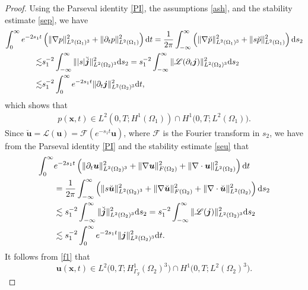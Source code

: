\documentclass[final,leqno]{siamltex}
\begin{document}
\begin{proof}
Using the Parseval identity \eqref{PI}, the assumptions \eqref{ash}, and the
stability estimate \eqref{sep}, we have
\begin{align*}
 \int_0^{\infty} e^{-2s_1 t}
 &\left(\|\nabla p\|^2_{L^2 (\Omega_1)^3}+\|\partial_t p
\|^2_{L^2(\Omega_1)}\right){\rm d}t
 =\frac{1}{2 \pi} \int_{-\infty}^{\infty}\left( \|\nabla \breve
p\|^2_{L^2(\Omega_1)^3}+ \|s \breve p\|^2_{L^2(\Omega_1)}\right) {\rm d} s_2\\
 \lesssim&  s_1 ^{-2} \int_{-\infty}^{\infty}  \| |s|\breve {\boldsymbol
j}\|^2_{L^2 (\Omega_2)^3}  {\rm d}s_2
  =s_1^{-2} \int_{-\infty}^{\infty} \|\mathscr L  ( \partial_t \boldsymbol
j)\|^2_{L^2 (\Omega_2)^3} {\rm d} s_2\\
\lesssim &s_1^{-2} \int_0^{\infty} e^{-2 s_1 t} \| \partial_t \boldsymbol
j\|^2_{L^2 (\Omega_2)^3} {\rm d} t,
 \end{align*}
which shows that
\begin{align*}
 p (\boldsymbol x, t) \in  L^2 \left(0, T; H^1(\Omega_1) \right)\cap H^1 \big(0,
T; L^2 (\Omega_1)\big).
\end{align*}
Since $\breve {\boldsymbol u} =\mathscr L (\boldsymbol u)= \mathscr F (e^{-s_1
t} \boldsymbol u)$, where $\mathscr F$ is the Fourier transform in $s_2$, we
have from the Parseval identity \eqref{PI} and the stability estimate
\eqref{seu} that
\begin{align*}
 \int_{0}^{\infty} & e^{-2 s_1 t} \left( \|\partial_t \boldsymbol u\|^2_{L^2
(\Omega_2)^3} +\| \nabla \boldsymbol u\|^2_{F (\Omega_2)} +\| \nabla \cdot
\boldsymbol u\|^2_{L^2 (\Omega_2)} \right) {\rm d} t \\
&=\frac{1}{2\pi} \int_{-\infty}^{\infty}\left( \|s \breve {\boldsymbol
u}\|^2_{L^2 (\Omega_2)^3}
+\|\nabla \breve {\boldsymbol u}\|^2_{F (\Omega_2)}+\|\nabla \cdot \breve
{\boldsymbol u}\|^2_{L^2 (\Omega_2)} \right) {\rm d} s_2\\
&\lesssim s_1^{-2} \int_{-\infty}^{\infty} \|\breve {\boldsymbol j}\|^2_{L^2
(\Omega_2)^3} {\rm d} s_2
= s_1^{-2} \int_{-\infty}^{\infty} \| \mathscr L (\boldsymbol j)\|^2_{L^2
(\Omega_2)^3} {\rm d} s_2\\
&\lesssim s_1^{-2} \int_0^{\infty} e^{-2 s_1 t} \|\boldsymbol j\|^2_{L^2
(\Omega_2)^3} {\rm d} t.
\end{align*}
It follows from \eqref{f1} that
\[
 \boldsymbol u  (\boldsymbol x, t)\in L^2  \big(0, T; H^1_{\Gamma_g}
(\Omega_2)^3\big) \cap H^1 \big( 0, T; L^2 (\Omega_2)^3 \big).
\]


\end{proof}
\end{document}
